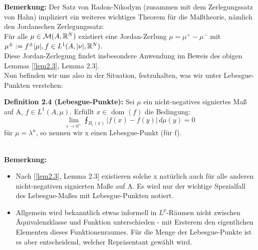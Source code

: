 \textbf{Bemerkung:} Der Satz von Radon-Nikodym (zusammen mit dem Zerlegungssatz von Hahn) impliziert ein weiteres wichtiges Theorem für die Maßtheorie, nämlich den Jordanschen Zerlegungssatz:\\
Für alle \(\mu \in \mathcal{M}(A,\mathbb{R}^N)\) existiert eine Jordan-Zerlung \(\mu = \mu^+ - \mu^-\) mit \(\mu^{\pm}:=f^{\pm}|\mu|, \\f \in L^1(A,|\nu|,\mathbb{R}^N)\).\\
Diese Jordan-Zerlegung findet insbesondere Anwendung im Beweis des obigen Lemmas [\ref{lem2.3}, Lemma 2.3].\\

Nun befinden wir uns also in der Situation, festzuhalten, was wir unter Lebesgue-Punkten verstehen:\\[0.5cm]
\colorbox{generalYellow}{\begin{minipage}{16cm}{\textcolor{black}{}{\label{def2.4}}}
\textbf{Definition 2.4 (Lebesgue-Punkte):} Sei \(\mu\) ein nicht-negatives signiertes Maß auf A, \(f \in L^1(A,\mu)\). Erfüllt \(x \in \text{ dom }(f)\) die Bedingung:
\begin{equation}
    \lim_{\epsilon \to 0^+} \intbar_{B_{\epsilon}(x)} |f(x)-f(y)| \, d\mu(y) = 0
\end{equation}
für \(\mu = \lambda^n\), so nennen wir x einen Lebesgue-Punkt (für f).
\end{minipage}}\\

\textbf{Bemerkung:} \begin{itemize}
    \item Nach [\ref{lem2.3}, Lemma 2.3] existieren solche x natürlich auch für alle anderen nicht-negativen signierten Maße auf A. Es wird nur der wichtige Spezialfall des Lebesgue-Maßes mit Lebesgue-Punkten notiert.
    \item Allgemein wird bekanntlich etwas informell in \(L^p\)-Räumen nicht zwischen \\Äquivalenzklasse und Funktion unterschieden - mit Ersterem den eigentlichen Elementen dieses Funktionenraumes. Für die Menge der Lebesgue-Punkte ist es aber entscheidend, welcher Repräsentant gewählt wird.
\end{itemize}

